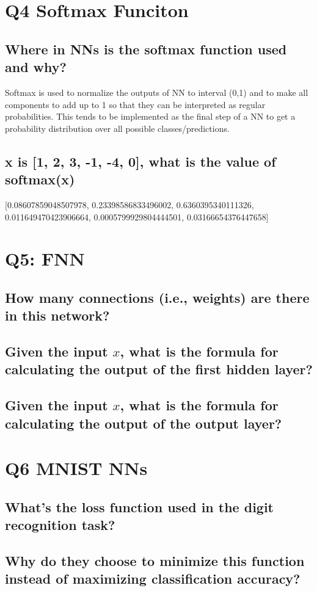 \documentclass[11pt]{article}
\begin{document}
\section{Q4 Softmax Funciton}
\subsection{Where in NNs is the softmax function used and why?}
Softmax is used to normalize the outputs of NN to interval (0,1) and to make all components to add up to 1 so that they can be interpreted as regular probabilities. This tends to be implemented as the final step of a NN to get a probability distribution over all possible classes/predictions.  \\
\subsection{x is [1, 2, 3, -1, -4, 0], what is the value of softmax(x)}
[0.08607859048507978, 0.23398586833496002, 0.6360395340111326, 0.011649470423906664, 0.0005799929804444501, 0.03166654376447658]
\section{Q5:  FNN}
\subsection{How many connections (i.e., weights) are there in this network?}
\subsection{Given the input $x$, what is the formula for calculating the output of the first hidden layer?}

\subsection{Given the input $x$, what is the formula for calculating the output of the output layer?}

\section{Q6 MNIST NNs}
\subsection{What's the loss function used in the digit recognition task?}

\subsection{Why do they choose to minimize this function instead of maximizing classification accuracy?}
\end{document}
